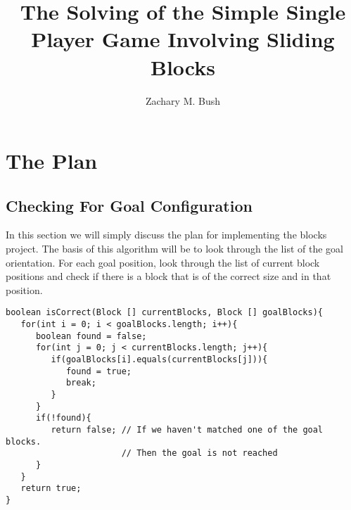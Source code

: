\documentclass[a4paper]{article}
\begin{document}
\title{The Solving of the Simple Single Player Game Involving Sliding Blocks}
\author{Zachary M. Bush}
\maketitle
\tableofcontents
\lstlistoflistings
\newpage
\section{The Plan}
\subsection{Checking For Goal Configuration}
In this section we will simply discuss the plan for implementing the blocks 
project. The basis of this algorithm will be to look through the list of the 
goal orientation. For each goal position, look through the list of current 
block positions and check if there is a block that is of the correct size and 
in that position. 
\begin{lstlisting}[caption=Checking for Goal Configuration]
boolean isCorrect(Block [] currentBlocks, Block [] goalBlocks){
   for(int i = 0; i < goalBlocks.length; i++){
      boolean found = false;
      for(int j = 0; j < currentBlocks.length; j++){
         if(goalBlocks[i].equals(currentBlocks[j])){
            found = true;
            break;
         }
      }
      if(!found){
         return false; // If we haven't matched one of the goal blocks. 
                       // Then the goal is not reached
      }
   }
   return true;
}
\end{lstlisting}
\end{document}
